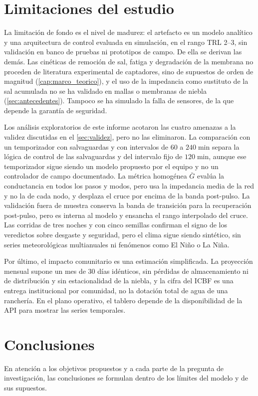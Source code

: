 \section{Limitaciones del estudio}
La limitaci\'on de fondo es el nivel de madurez: el artefacto es un modelo anal\'itico y una arquitectura de control evaluada en simulaci\'on, en el rango TRL 2--3, sin validaci\'on en banco de pruebas ni prototipos de campo. De ella se derivan las dem\'as. Las cin\'eticas de remoci\'on de sal, fatiga y degradaci\'on de la membrana no proceden de literatura experimental de captadores, sino de supuestos de orden de magnitud (\cref{cap:marco_teorico}), y el uso de la impedancia como sustituto de la sal acumulada no se ha validado en mallas o membranas de niebla (\cref{sec:antecedentes}). Tampoco se ha simulado la falla de sensores, de la que depende la garant\'ia de seguridad.

Los an\'alisis exploratorios de este informe acotaron las cuatro amenazas a la validez discutidas en el \cref{sec:validez}, pero no las eliminaron. La comparaci\'on con un temporizador con salvaguardas y con intervalos de 60 a $240\;\text{min}$ separa la l\'ogica de control de las salvaguardas y del intervalo fijo de $120\;\text{min}$, aunque ese temporizador sigue siendo un modelo propuesto por el equipo y no un controlador de campo documentado. La m\'etrica homog\'enea $\bar{G}$ eval\'ua la conductancia en todos los pasos y modos, pero usa la impedancia media de la red y no la de cada nodo, y desplaza el cruce por encima de la banda post-pulso. La validaci\'on fuera de muestra conserva la banda de transici\'on para la recuperaci\'on post-pulso, pero es interna al modelo y ensancha el rango interpolado del cruce. Las corridas de tres noches y con cinco semillas confirman el signo de los veredictos sobre desgaste y seguridad, pero el clima sigue siendo sint\'etico, sin series meteorol\'ogicas multianuales ni fen\'omenos como El Ni\~no o La Ni\~na.

Por \'ultimo, el impacto comunitario es una estimaci\'on simplificada. La proyecci\'on mensual supone un mes de 30 d\'ias id\'enticos, sin p\'erdidas de almacenamiento ni de distribuci\'on y sin estacionalidad de la niebla, y la cifra del ICBF es una entrega institucional por comunidad, no la dotaci\'on total de agua de una rancher\'ia. En el plano operativo, el tablero depende de la disponibilidad de la API para mostrar las series temporales.

\section{Conclusiones}
En atenci\'on a los objetivos propuestos y a cada parte de la pregunta de investigaci\'on, las conclusiones se formulan dentro de los l\'imites del modelo y de sus supuestos.


